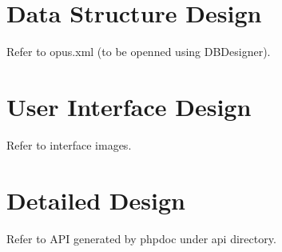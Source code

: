 \documentclass[a4, 11pt]{article}
\begin{document}
\section{Data Structure Design}
Refer to opus.xml (to be openned using DBDesigner).

\section{User Interface Design}
Refer to interface images.

\section{Detailed Design}
Refer to API generated by phpdoc under api directory.
\end{document}
